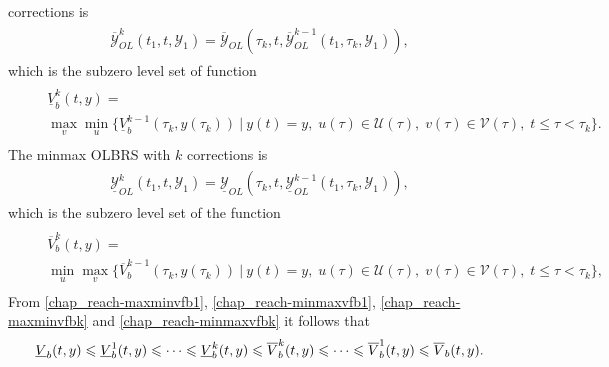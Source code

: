 \documentclass[letterpaper,10pt,english]{sphinxmanual}
\begin{document}
corrections is
\label{chap_reach:equation-maxminbk}\begin{gather}
\begin{split}\overline{{\mathcal Y}}_{OL}^k(t_1, t, {\mathcal Y}_1) = \overline{{\mathcal Y}}_{OL}(\tau_k, t, \overline{{\mathcal Y}}_{OL}^{k-1}(t_1, \tau_k, {\mathcal Y}_1)),\end{split}\label{chap_reach-maxminbk}
\end{gather}
which is the subzero level set of function
\label{chap_reach:equation-maxminvfbk}\begin{gather}
\begin{split}\begin{aligned}
&&\underline{V}^k_b(t, y) = \nonumber \\
&&\max_v\min_u\{\underline{V}^{k-1}_b(\tau_k, y(\tau_k)) ~|~
y(t)=y, \; u(\tau)\in{\mathcal U}(\tau), \;
v(\tau)\in{\mathcal V}(\tau), \; t\leqslant\tau<\tau_k\}.
\end{aligned}\end{split}\label{chap_reach-maxminvfbk}
\end{gather}
The minmax OLBRS with $k$ corrections is
\label{chap_reach:equation-minmaxbk}\begin{gather}
\begin{split}\underline{{\mathcal Y}}_{OL}^k(t_1, t, {\mathcal Y}_1) = \underline{{\mathcal Y}}_{OL}(\tau_k, t, \underline{{\mathcal Y}}_{OL}^{k-1}(t_1, \tau_k, {\mathcal Y}_1)),\end{split}\label{chap_reach-minmaxbk}
\end{gather}
which is the subzero level set of the function
\label{chap_reach:equation-minmaxvfbk}\begin{gather}
\begin{split}\begin{aligned}
&&\overline{V}^k_b(t, y) = \nonumber \\
&&\min_u\max_v\{\overline{V}^{k-1}_b(\tau_k, y(\tau_k)) ~|~
y(t)=y, \; u(\tau)\in{\mathcal U}(\tau), \;
v(\tau)\in{\mathcal V}(\tau), \; t\leqslant\tau<\tau_k\},
\end{aligned}\end{split}\label{chap_reach-minmaxvfbk}
\end{gather}
From \eqref{chap_reach-maxminvfb1}, \eqref{chap_reach-minmaxvfb1}, \eqref{chap_reach-maxminvfbk} and \eqref{chap_reach-minmaxvfbk}
it follows that
\begin{gather}
\begin{split}\underline{V}_b(t, y) \leqslant\underline{V}^1_b(t, y)\leqslant\cdots
\leqslant\underline{V}^k_b(t, y) \leqslant\overline{V}^k_b(t, y) \leqslant\cdots
\leqslant\overline{V}^1_b(t, y) \leqslant\overline{V}_b(t, y) .\end{split}\notag
\end{gather}
\end{document}
